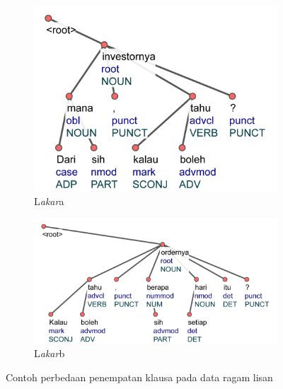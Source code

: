 \begin{figure}
\centering

\begin{subfigure}{.4\linewidth}
  \centering
  \includegraphics[width=1\linewidth] {pics/ls1436.jpg} 
	\caption{L\textit{akar}a}
	\label{fig:ls1436} 
\end{subfigure}
%
\begin{subfigure}{.58\linewidth}
  \centering
  \includegraphics[width=1\linewidth]{pics/ls1460.jpg} 
	\caption{L\textit{akar}b}
	\label{fig:ls1460} 
\end{subfigure}

\caption{Contoh perbedaan penempatan klausa pada data ragam lisan}
\label{fig:akarcontoh}
\end{figure}


